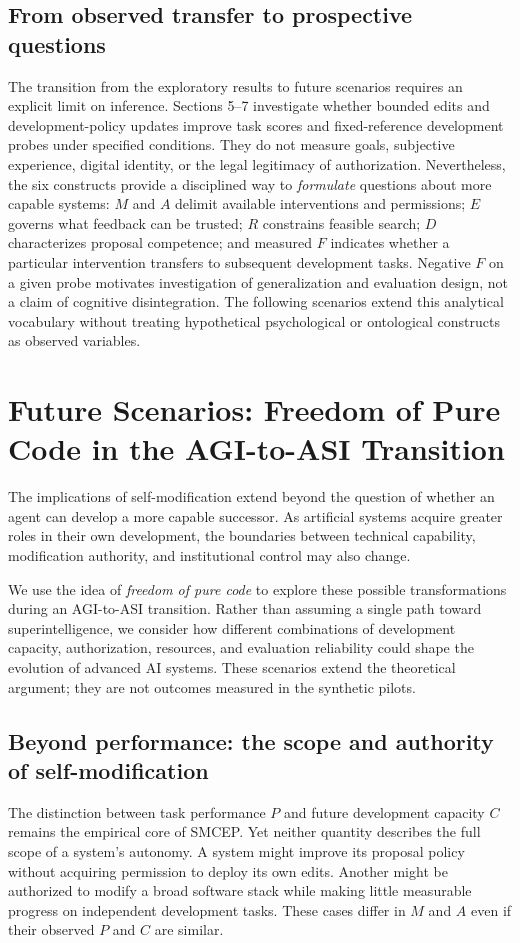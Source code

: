 \documentclass[11pt,a4paper]{article}
\begin{document}
\subsection{From observed transfer to prospective questions}
The transition from the exploratory results to future scenarios requires an explicit limit on inference. Sections 5--7 investigate whether bounded edits and development-policy updates improve task scores and fixed-reference development probes under specified conditions. They do not measure goals, subjective experience, digital identity, or the legal legitimacy of authorization. Nevertheless, the six constructs provide a disciplined way to \emph{formulate} questions about more capable systems: $M$ and $A$ delimit available interventions and permissions; $E$ governs what feedback can be trusted; $R$ constrains feasible search; $D$ characterizes proposal competence; and measured $F$ indicates whether a particular intervention transfers to subsequent development tasks. Negative $F$ on a given probe motivates investigation of generalization and evaluation design, not a claim of cognitive disintegration. The following scenarios extend this analytical vocabulary without treating hypothetical psychological or ontological constructs as observed variables.

\section{Future Scenarios: Freedom of Pure Code in the AGI-to-ASI Transition}\label{sec:future}
The implications of self-modification extend beyond the question of whether an agent can develop a more
capable successor. As artificial systems acquire greater roles in their own development, the boundaries
between technical capability, modification authority, and institutional control may also change.

We use the idea of \emph{freedom of pure code} to explore these possible transformations during an
AGI-to-ASI transition. Rather than assuming a single path toward superintelligence, we consider how
different combinations of development capacity, authorization, resources, and evaluation reliability
could shape the evolution of advanced AI systems. These scenarios extend the theoretical argument;
they are not outcomes measured in the synthetic pilots.

\subsection{Beyond performance: the scope and authority of self-modification}
The distinction between task performance $P$ and future development capacity $C$ remains the empirical core of SMCEP. Yet neither quantity describes the full scope of a system's autonomy. A system might improve its proposal policy without acquiring permission to deploy its own edits. Another might be authorized to modify a broad software stack while making little measurable progress on independent development tasks. These cases differ in $M$ and $A$ even if their observed $P$ and $C$ are similar.
\end{document}
